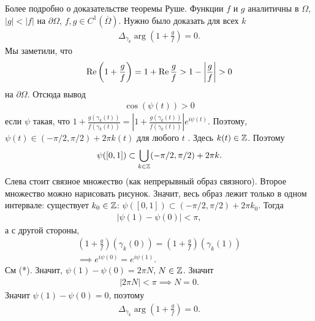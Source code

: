 \documentclass[../complex-analysis.tex]{subfiles}
\begin{document}
 Более подробно о доказательстве теоремы Руше. Функции $ f $ и $ g $ аналитичны в $ \Omega $, $ \left| g \right| < \left| f \right| $ на $ \partial\Omega $, $ f, g \in C^{1}(\overline\Omega) $. Нужно было доказать для всех $ k $
 \begin{align*}
  \Delta_{\gamma_k} \arg \left( 1 + \frac{g}{f} \right) = 0.
 \end{align*} Мы заметили, что
 \begin{align*}
  \operatorname{Re}\left(1 + \frac{g}{f}\right) = 1 + \operatorname{Re} \frac{g}{f} > 1 - \left| \frac{g}{f} \right| > 0 
 \end{align*} на $ \partial\Omega $. Отсюда вывод
 \begin{align*}
  \cos(\psi(t)) > 0
 \end{align*} если $ \psi $ такая, что  $ 1 + \frac{g(\gamma_k(t))}{f(\gamma_k(t))} = \left| 1 + \frac{g(\gamma_k(t))}{f(\gamma_k(t))} \right|e^{i\psi(t)} $. Поэтому, $ \psi(t) \in (- \pi / 2, \pi / 2) + 2\pi k (t) $ для любого  $ t $ . Здесь $ k(t) \in \mathbb{Z} $. Поэтому
  \begin{align*}
  \psi([0,1]) \subset \bigcup_{k \in \mathbb{Z}} (-\pi / 2, \pi / 2) + 2\pi k.
 \end{align*} Слева стоит связное множество (как непрерывный образ связного). Второе множество можно нарисовать {\color{red} рисунок}. Значит, весь образ лежит только в одном интервале: существует $ k_0 \in \mathbb{Z} $: $ \psi([0,1]) \subset (-\pi / 2, \pi / 2) + 2\pi k_0 $. Тогда
 \begin{align*}
  \left|\psi(1) - \psi(0) \right| < \pi,
 \end{align*} а с другой стороны,
 \begin{align*}
  \left( 1+ \frac{g}{f} \right)(\gamma_k(0)) = \left(1 + \frac{g} f\right)(\gamma_k(1)) \\
  \implies e^{i\psi(0)} = e^{i\psi(1)}.
 \end{align*} См (*). Значит, $ \psi(1) - \psi(0) = 2\pi N $, $ N \in \mathbb{Z} $. Значит
 \begin{align*}
  \left|2\pi N \right| < \pi \implies N = 0.
 \end{align*} Значит $ \psi(1) -\psi(0)=0 $, поэтому
 \begin{align*}
  \Delta_{\gamma_k} \arg \left( 1 + \frac{g}{f} \right) = 0.
 \end{align*}
\end{document}
